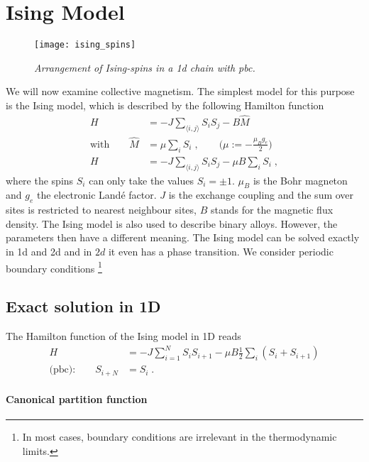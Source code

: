 \chapter{Ising Model}\label{chap:ising}
%


\begin{figure}[h]
\begin{center}
\texttt{[image: ising\_spins]}
\caption{{\it Arrangement of Ising-spins in a 1d chain with pbc.}}
\end{center}
\end{figure}
%


%
We will now examine collective magnetism.
The simplest model for this purpose is the Ising model, which is described by the following
Hamilton function 
%
\begin{align}
H &= - J \sum_{\langle i,j\rangle} S_{i} S_{j} - B \hat M\\
\text{with} \qquad \hat M &=  \mu \sum_{i} S_{i}\;,\qquad \bigg(\mu := - \frac{\mu_{B} g_{e}}{2}\bigg)\\
H&= - J \sum_{\langle i,j\rangle} S_{i} S_{j} - \mu B \sum_{i} S_{i}\;,
\end{align}
%
where the spins $S_{i}$ can only take the values  $S_{i}=\pm 1$.
$\mu_{B}$ is the Bohr magneton and $g_{e}$ the electronic Land\'e factor.
$J$ is the exchange coupling and the sum over sites is restricted to nearest neighbour sites, 
$B$ stands for the magnetic flux density.
The Ising model is also used to describe binary alloys.
However, the parameters then have a different meaning.
The Ising model can be solved exactly in 1d and 2d and in $2d$ it even has a phase transition. 
We consider periodic boundary conditions \footnote{In most cases, boundary conditions are 
irrelevant in the  thermodynamic limits. } 

\section{Exact solution in 1D}
The Hamilton function of the Ising model in 1D reads
%
\begin{align*}
H &= - J \sum_{i=1}^{N} S_{i} S_{i+1} - \mu  B \frac{1}{2} \sum_{i} (S_{i}+S_{i+1})\\
\text{(pbc):}\qquad S_{i+N} &= S_{i}\;.
\end{align*}
%

\subsubsection{Canonical partition function}

